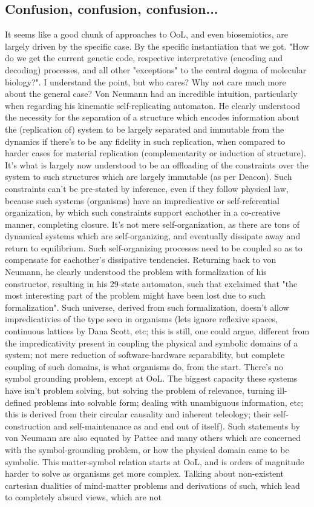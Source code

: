 \documentclass[a4paper,12pt,twoside,leqno]{article}
\begin{document}
\subsection*{Confusion, confusion, confusion...}
It seems like a good chunk of approaches to OoL, and even biosemiotics, are largely driven by the specific case. By the specific instantiation that we got. "How do we get the current genetic code, respective interpretative (encoding and decoding) processes, and all other "exceptions" to the central dogma of molecular biology?". I understand the point, but who cares? Why not care much more about the general case? Von Neumann had an incredible intuition, particularly when regarding his kinematic self-replicating automaton. He clearly understood the necessity for the separation of a structure which encodes information about the (replication of) system to be largely separated and immutable from the dynamics if there's to be any fidelity in such replication, when compared to harder cases for material replication (complementarity or induction of structure). It's what is largely now understood to be an offloading of the constraints over the system to such structures which are largely immutable (as per Deacon). Such constraints can't be pre-stated by inference, even if they follow physical law, because such systems (organisms) have an impredicative or self-referential organization, by which such constraints support eachother in a co-creative manner, completing closure. It's not mere self-organization, as there are tons of dynamical systems which are self-organizing, and eventually dissipate away and return to equilibrium. Such self-organizing processes need to be coupled so as to compensate for eachother's dissipative tendencies. Returning back to von Neumann, he clearly understood the problem with formalization of his constructor, resulting in his 29-state automaton, such that exclaimed that "the most interesting part of the problem might have been lost due to such formalization". Such universe, derived from such formalization, doesn't allow impredicativies of the type seen in organisms (lets ignore reflexive spaces, continuous lattices by Dana Scott, etc; this is still, one could argue, different from the impredicativity present in coupling the physical and symbolic domains of a system; not mere reduction of software-hardware separability, but complete coupling of such domains, is what organisms do, from the start. There's no symbol grounding problem, except at OoL. The biggest capacity these systems have isn't problem solving, but solving the problem of relevance, turning ill-defined problems into solvable form; dealing with unambiguous information, etc; this is derived from their circular causality and inherent teleology; their self-construction and self-maintenance as and end out of itself). Such statements by von Neumann are also equated by Pattee and many others which are concerned with the symbol-grounding problem, or how the physical domain came to be symbolic. This matter-symbol relation starts at OoL, and is orders of magnitude harder to solve as organisms get more complex. Talking about non-existent cartesian dualities of mind-matter problems and derivations of such, which lead to completely absurd views, which are not 
\end{document}
